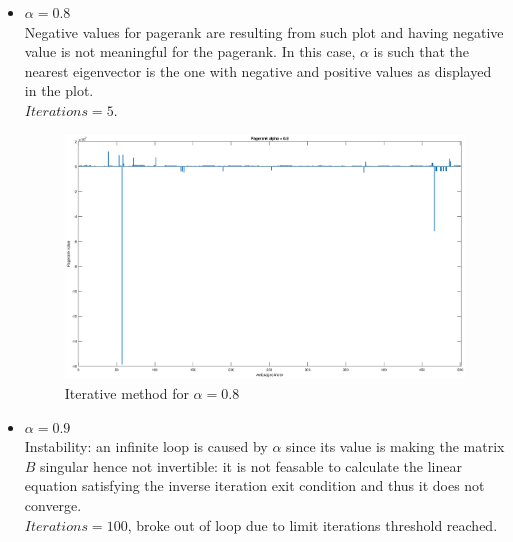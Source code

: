 \documentclass[unicode,11pt,a4paper,oneside,numbers=endperiod,openany]{scrartcl}
\begin{document}
\begin{itemize}
    \item $\alpha = 0.8$ \\
          Negative values for pagerank are resulting from such plot and having negative value is not meaningful for the
          pagerank.
          In this case, $\alpha$ is such that the nearest eigenvector is the one with negative and positive values as displayed in the plot. \\
          $Iterations = 5.$

          \begin{figure}[H]
              \centering
              \includegraphics[width=1\textwidth, trim={0 0 0 0}]{figures/ex4p3_a08.eps}
              \caption{Iterative method for $\alpha = 0.8$}
              \label{fig:e4p3_a08}
          \end{figure}

    \item $\alpha = 0.9$ \\
          Instability: an infinite loop is caused by $\alpha$ since its value is making the matrix $B$ singular
          hence not invertible:
          it is not feasable to calculate the linear equation satisfying the inverse iteration exit condition
          and thus it does not converge. \\
          $Iterations = 100$, broke out of loop due to limit iterations threshold reached.


\end{itemize}
\end{document}
